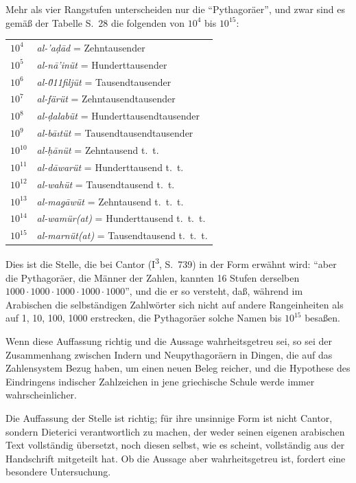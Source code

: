 \documentclass[11pt,a4paper]{article}
\newcommand{\enquote}[1]{``#1''}
\begin{document}
Mehr als vier Rangstufen unterscheiden nur die \enquote{Pythagor\"aer}, und zwar sind es gem\"a\ss{} der Tabelle S.\ 28 die folgenden von $10^{4}$ bis $10^{15}$:
\begin{center}
\begin{tabular}{ll}
$10^{4}$ & \textit{al-'a\d{d}\=ad} = Zehntausender \\
$10^{5}$ & \textit{al-n\=a'in\"ut} = Hunderttausender \\
$10^{6}$ & \textit{al-\u011filj\"ut} = Tausendtausender \\
$10^{7}$ & \textit{al-f\"ar\"ut} = Zehntausendtausender \\
$10^{8}$ & \textit{al-\d{d}alab\"ut} = Hunderttausendtausender \\
$10^{9}$ & \textit{al-b\=a\i{}t\"ut} = Tausendtausendtausender \\
$10^{10}$ & \textit{al-\d{h}\=an\"ut} = Zehntausend t.\ t. \\
$10^{11}$ & \textit{al-d\=awar\"ut} = Hunderttausend t.\ t. \\
$10^{12}$ & \textit{al-wah\"ut} = Tausendtausend t.\ t. \\
$10^{13}$ & \textit{al-ma\d{g}\=aw\"ut} = Zehntausend t.\ t.\ t. \\
$10^{14}$ & \textit{al-wam\"ur(at)} = Hunderttausend t.\ t.\ t. \\
$10^{15}$ & \textit{al-marn\"ut(at)} = Tausendtausend t.\ t.\ t.
\end{tabular}
\end{center}

Dies ist die Stelle, die bei Cantor (I\textsuperscript{3}, S.\ 739) in der Form erw\"ahnt wird: \enquote{aber die Pythagor\"aer, die M\"anner der Zahlen, kannten 16 Stufen derselben $1000 \cdot 1000 \cdot 1000 \cdot 1000 \cdot 1000$}, und die er so versteht, da\ss{}, w\"ahrend im Arabischen die selbst\"andigen Zahlw\"orter sich nicht auf andere Rangeinheiten als auf 1, 10, 100, 1000 erstrecken, die Pythagor\"aer solche Namen bis $10^{15}$ besa\ss{}en.

Wenn diese Auffassung richtig und die Aussage wahrheitsgetreu sei, so sei der Zusammenhang zwischen Indern und Neupythagor\"aern in Dingen, die auf das Zahlensystem Bezug haben, um einen neuen Beleg reicher, und die Hypothese des Eindringens indischer Zahlzeichen in jene griechische Schule werde immer wahrscheinlicher.

Die Auffassung der Stelle ist richtig; f\"ur ihre unsinnige Form ist nicht Cantor, sondern Dieterici verantwortlich zu machen, der weder seinen eigenen arabischen Text vollst\"andig \"ubersetzt, noch diesen selbst, wie es scheint, vollst\"andig aus der Handschrift mitgeteilt hat. Ob die Aussage aber wahrheitsgetreu ist, fordert eine besondere Untersuchung.
\end{document}
